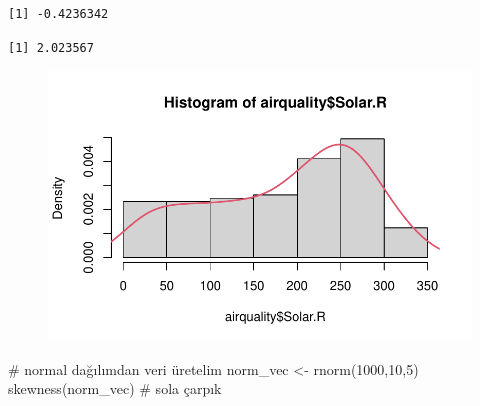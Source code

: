 \documentclass[
  letterpaper,
  DIV=11,
  numbers=noendperiod]{scrreprt}
\newenvironment{Shaded}{\begin{snugshade}}{\end{snugshade}}
\newcommand{\AttributeTok}[1]{\textcolor[rgb]{0.40,0.45,0.13}{#1}}
\newcommand{\CommentTok}[1]{\textcolor[rgb]{0.37,0.37,0.37}{#1}}
\newcommand{\ConstantTok}[1]{\textcolor[rgb]{0.56,0.35,0.01}{#1}}
\newcommand{\DecValTok}[1]{\textcolor[rgb]{0.68,0.00,0.00}{#1}}
\newcommand{\FunctionTok}[1]{\textcolor[rgb]{0.28,0.35,0.67}{#1}}
\newcommand{\NormalTok}[1]{\textcolor[rgb]{0.00,0.23,0.31}{#1}}
\newcommand{\OtherTok}[1]{\textcolor[rgb]{0.00,0.23,0.31}{#1}}
\newcommand{\SpecialCharTok}[1]{\textcolor[rgb]{0.37,0.37,0.37}{#1}}
\begin{document}
\begin{verbatim}
[1] -0.4236342
\end{verbatim}

\begin{Shaded}
\end{Shaded}

\begin{verbatim}
[1] 2.023567
\end{verbatim}

\begin{Shaded}
\end{Shaded}

\begin{figure}[H]

{\centering \includegraphics{statistics_files/figure-pdf/unnamed-chunk-10-2.pdf}

}

\end{figure}

\begin{Shaded}
\begin{Highlighting}[]
\CommentTok{\# normal dağılımdan veri üretelim}
\NormalTok{norm\_vec }\OtherTok{\textless{}{-}} \FunctionTok{rnorm}\NormalTok{(}\DecValTok{1000}\NormalTok{,}\DecValTok{10}\NormalTok{,}\DecValTok{5}\NormalTok{)}
\FunctionTok{skewness}\NormalTok{(norm\_vec) }\CommentTok{\# sola çarpık}
\end{Highlighting}
\end{Shaded}
\end{document}
